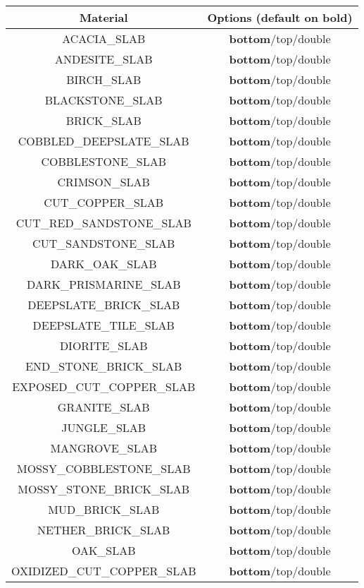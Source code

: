 \begin{longtable}{ |c|c| }
	\hline
	Material & Options (default on bold) \\
	\hline
	\endhead
	ACACIA\_SLAB & \textbf{bottom}/top/double \\
	ANDESITE\_SLAB & \textbf{bottom}/top/double \\
	BIRCH\_SLAB & \textbf{bottom}/top/double \\
	BLACKSTONE\_SLAB & \textbf{bottom}/top/double \\
	BRICK\_SLAB & \textbf{bottom}/top/double \\
	COBBLED\_DEEPSLATE\_SLAB & \textbf{bottom}/top/double \\
	COBBLESTONE\_SLAB & \textbf{bottom}/top/double \\
	CRIMSON\_SLAB & \textbf{bottom}/top/double \\
	CUT\_COPPER\_SLAB & \textbf{bottom}/top/double \\
	CUT\_RED\_SANDSTONE\_SLAB & \textbf{bottom}/top/double \\
	CUT\_SANDSTONE\_SLAB & \textbf{bottom}/top/double \\
	DARK\_OAK\_SLAB & \textbf{bottom}/top/double \\
	DARK\_PRISMARINE\_SLAB & \textbf{bottom}/top/double \\
	DEEPSLATE\_BRICK\_SLAB & \textbf{bottom}/top/double \\
	DEEPSLATE\_TILE\_SLAB & \textbf{bottom}/top/double \\
	DIORITE\_SLAB & \textbf{bottom}/top/double \\
	END\_STONE\_BRICK\_SLAB & \textbf{bottom}/top/double \\
	EXPOSED\_CUT\_COPPER\_SLAB & \textbf{bottom}/top/double \\
	GRANITE\_SLAB & \textbf{bottom}/top/double \\
	JUNGLE\_SLAB & \textbf{bottom}/top/double \\
	MANGROVE\_SLAB & \textbf{bottom}/top/double \\
	MOSSY\_COBBLESTONE\_SLAB & \textbf{bottom}/top/double \\
	MOSSY\_STONE\_BRICK\_SLAB & \textbf{bottom}/top/double \\
	MUD\_BRICK\_SLAB & \textbf{bottom}/top/double \\
	NETHER\_BRICK\_SLAB & \textbf{bottom}/top/double \\
	OAK\_SLAB & \textbf{bottom}/top/double \\
	OXIDIZED\_CUT\_COPPER\_SLAB & \textbf{bottom}/top/double \\

\end{longtable}
